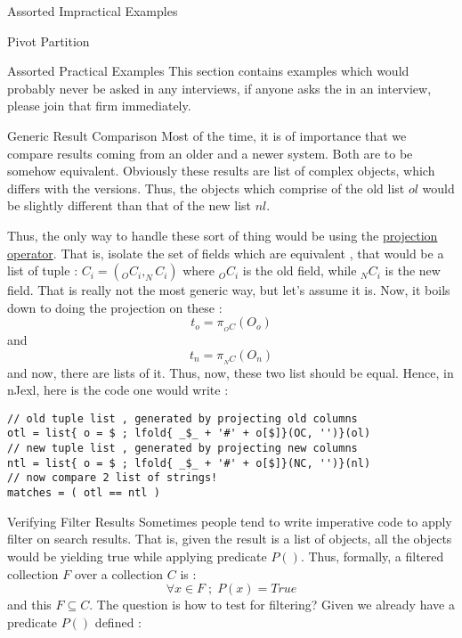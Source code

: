 \begin{section}{Assorted Impractical Examples}
\begin{subsection}{Pivot Partition}
\end{subsection}

\end{section}




\begin{section}{Assorted Practical Examples}
This section contains examples which would probably never be asked in any interviews,
if anyone asks the in an interview, please join that firm immediately.

\begin{subsection}{Generic Result Comparison}
Most of the time, it is of importance that we compare results coming from an 
older and a newer system. Both are to be somehow equivalent.
Obviously these results are list of complex objects, which differs with the versions.
Thus, the objects which comprise of the old list $ol$ would be slightly different 
than that of the new list $nl$. 

Thus, the only way to handle these sort of thing would be using the 
\href{https://en.wikipedia.org/wiki/Projection\_(relational\_algebra)}{projection operator}.
That is, isolate the set of fields which are equivalent , that would be a list of tuple :
$C_i = ( _OC_i,_NC_i )$ where $_OC_i$ is the old field, while $_NC_i$ is the new field.
That is really not the most generic way, but let's assume it is.
Now, it boils down to doing the projection on these :
$$
t_o = \pi_{ _OC }(O_o) 
$$ 
and
$$
t_n = \pi_{ _NC }(O_n)
$$ 
and now, there are lists of it. Thus, now, these two list should be equal.
Hence, in nJexl, here is the code one would write :

\begin{center}\begin{minipage}{\linewidth}
\begin{lstlisting}[style=JexlStyle]
// old tuple list , generated by projecting old columns 
otl = list{ o = $ ; lfold{ _$_ + '#' + o[$]}(OC, '')}(ol)
// new tuple list , generated by projecting new columns 
ntl = list{ o = $ ; lfold{ _$_ + '#' + o[$]}(NC, '')}(nl)
// now compare 2 list of strings!
matches = ( otl == ntl )  
\end{lstlisting}  
\end{minipage}\end{center}
\end{subsection}

\begin{subsection}{Verifying Filter Results}
Sometimes people tend to write imperative code to apply filter on search results.
That is, given the result is a list of objects, all the objects would be yielding true
while applying predicate $P()$. Thus, formally, a filtered collection $F$ over a collection $C$ is :
$$
\forall x \in F \; ; \; P(x)  = True 
$$
and this $F \subseteq C$. The question is how to test for filtering?
Given we already have a predicate $P()$ defined :
 

\end{subsection}
\end{section}
